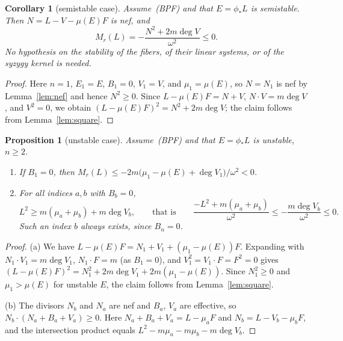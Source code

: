 \documentclass[11pt]{article}
\newtheorem{proposition}[theorem]{Proposition}
\newtheorem{corollary}[theorem]{Corollary}
\theoremstyle{definition}
\theoremstyle{remark}
\newcommand{\bpf}{\textup{(BPF)}}
\begin{document}
\begin{corollary}[semistable case]\label{cor:ss}
Assume~\bpf{} and that $E=\phi_*L$ is semistable. Then $N=L-V-\mu(E)F$ is nef, and
\[
M_r(L)=-\frac{N^2+2m\deg V}{\omega^2}\le 0 .
\]
No hypothesis on the stability of the fibers, of their linear systems, or of the
syzygy kernel is needed.
\end{corollary}

\begin{proof}
Here $n=1$, $E_1=E$, $B_1=0$, $V_1=V$, and $\mu_1=\mu(E)$, so $N=N_1$ is nef by
Lemma~\ref{lem:nef} and hence $N^2\ge 0$. Since $L-\mu(E)F=N+V$,
$N\cdot V=m\deg V$, and $V^2=0$, we obtain $(L-\mu(E)F)^2=N^2+2m\deg V$; the
claim follows from Lemma~\ref{lem:square}.
\end{proof}

\begin{proposition}[unstable case]\label{prop:unstable}
Assume~\bpf{} and that $E=\phi_*L$ is unstable, $n\ge 2$.
\begin{enumerate}[label=(\alph*)]
\item If $B_1=0$, then
$M_r(L)\le-2m\bigl(\mu_1-\mu(E)+\deg V_1\bigr)/\omega^2<0$.
\item For all indices $a,b$ with $B_b=0$,
\[
L^2\ge m(\mu_a+\mu_b)+m\deg V_b ,\qquad\text{that is}\qquad
\frac{-L^2+m(\mu_a+\mu_b)}{\omega^2}\le-\frac{m\deg V_b}{\omega^2}\le 0 .
\]
Such an index $b$ always exists, since $B_n=0$.
\end{enumerate}
\end{proposition}

\begin{proof}
(a) We have $L-\mu(E)F=N_1+V_1+(\mu_1-\mu(E))F$. Expanding with
$N_1\cdot V_1=m\deg V_1$, $N_1\cdot F=m$ (as $B_1=0$), and
$V_1^2=V_1\cdot F=F^2=0$ gives
$(L-\mu(E)F)^2=N_1^2+2m\deg V_1+2m(\mu_1-\mu(E))$. Since $N_1^2\ge 0$ and
$\mu_1>\mu(E)$ for unstable $E$, the claim follows from Lemma~\ref{lem:square}.

(b) The divisors $N_b$ and $N_a$ are nef and $B_a$, $V_a$ are effective, so
$N_b\cdot(N_a+B_a+V_a)\ge 0$. Here $N_a+B_a+V_a=L-\mu_aF$ and $N_b=L-V_b-\mu_bF$,
and the intersection product equals $L^2-m\mu_a-m\mu_b-m\deg V_b$.
\end{proof}
\end{document}
